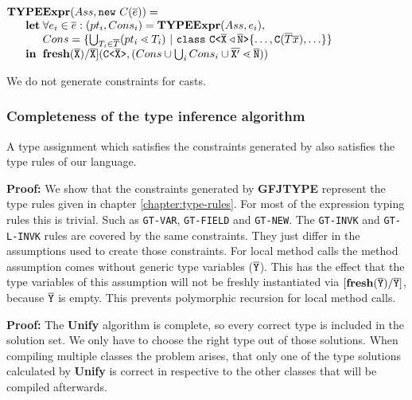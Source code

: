 \documentclass[a4paper,USenglish,cleveref, autoref, thm-restate]{lipics-v2021}
\begin{document}
$\begin{array}{@{}l@{}l@{}l}
\textbf{TY}& \textbf{PE} & \textbf{Expr} (Ass, \mathtt{new }\ C(\overline{e}) ) = \\
& \textbf{let} %
& \forall e_i \in \overline{e} : (pt_i, Cons_i) = \textbf{TYPEExpr}(Ass, e_i)  ,\\
& & Cons = \{ \bigcup_{T_i \in \overline{T}} (pt_i \lessdot T_i) \ | \ \mathtt{class }\ \exptype{C}{\ol{X} \triangleleft \ol{N}}\{ \ldots, \texttt{C}(\overline{T} \overline{x}), \ldots \} \}\\
& \mathbf{in}%
& \textbf{fresh}(\ol{X})/\ol{X}](\exptype{C}{\ol{X}}, (Cons \cup \bigcup_i Cons_i \cup \ol{X'} \lessdot \ol{N}))\\
\end{array}
$

We do not generate constraints for casts.

\subsubsection{Completeness of the type inference algorithm}
\begin{theoremAndi}
  A type assignment which satisfies the constraints generated by \FGJType also satisfies the type rules of our \TFGJ language.
\end{theoremAndi}
\textbf{Proof:}
We show that the constraints generated by \textbf{GFJTYPE}
represent the type rules given in chapter \ref{chapter:type-rules}.
For most of the expression typing rules this is trivial.
Such as \texttt{GT-VAR}, \texttt{GT-FIELD} and \texttt{GT-NEW}.
The \texttt{GT-INVK} and \texttt{GT-L-INVK} rules are covered by the same constraints.
They just differ in the assumptions used to create those constraints.
For local method calls the method assumption comes without generic type variables ($\mathtt{\overline{\tt Y}}$).
This has the effect that the type variables of this assumption will not be freshly instantiated
via $\mathtt{[\textbf{fresh}(\overline{\tt Y})/\overline{\tt Y}]}$, because $\mathtt{\overline{\tt Y}}$ is empty.
This prevents polymorphic recursion for local method calls.

\begin{theoremAndi}

\end{theoremAndi}
\textbf{Proof:} The \textbf{Unify} algorithm is complete, so every correct type is included in the solution set.
We only have to choose the right type out of those solutions.
When compiling multiple classes the problem arises,
that only one of the type solutions calculated by \textbf{Unify} is correct
in respective to the other classes that will be compiled afterwards.
\end{document}
